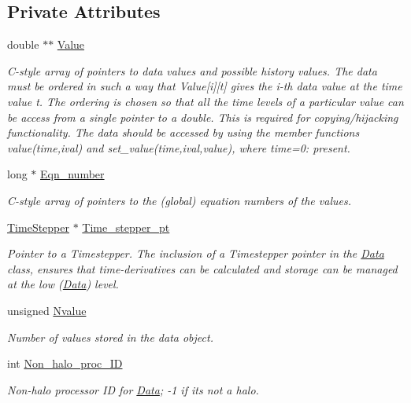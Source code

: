 \subsection*{Private Attributes}
\begin{DoxyCompactItemize}
\item 
double $\ast$$\ast$ \hyperlink{classoomph_1_1Data_aa69aab29cca43c9be329904807203ef1}{Value}
\begin{DoxyCompactList}\small\item\em C-\/style array of pointers to data values and possible history values. The data must be ordered in such a way that Value\mbox{[}i\mbox{]}\mbox{[}t\mbox{]} gives the i-\/th data value at the time value t. The ordering is chosen so that all the time levels of a particular value can be access from a single pointer to a double. This is required for copying/hijacking functionality. The data should be accessed by using the member functions value(time,ival) and set\+\_\+value(time,ival,value), where time=0\+: present. \end{DoxyCompactList}\item 
long $\ast$ \hyperlink{classoomph_1_1Data_a1863d191b66fc4b22fa282ef357c0513}{Eqn\+\_\+number}
\begin{DoxyCompactList}\small\item\em C-\/style array of pointers to the (global) equation numbers of the values. \end{DoxyCompactList}\item 
\hyperlink{classoomph_1_1TimeStepper}{Time\+Stepper} $\ast$ \hyperlink{classoomph_1_1Data_a63442f4cabaff13e7116e0b80d350d92}{Time\+\_\+stepper\+\_\+pt}
\begin{DoxyCompactList}\small\item\em Pointer to a Timestepper. The inclusion of a Timestepper pointer in the \hyperlink{classoomph_1_1Data}{Data} class, ensures that time-\/derivatives can be calculated and storage can be managed at the low (\hyperlink{classoomph_1_1Data}{Data}) level. \end{DoxyCompactList}\item 
unsigned \hyperlink{classoomph_1_1Data_a379d45fb0d0170fcdec06dbbc97a504d}{Nvalue}
\begin{DoxyCompactList}\small\item\em Number of values stored in the data object. \end{DoxyCompactList}\item 
int \hyperlink{classoomph_1_1Data_a5474e601ebda6bde66c179c92831729e}{Non\+\_\+halo\+\_\+proc\+\_\+\+ID}
\begin{DoxyCompactList}\small\item\em Non-\/halo processor ID for \hyperlink{classoomph_1_1Data}{Data}; -\/1 if it\textquotesingle{}s not a halo. \end{DoxyCompactList}\end{DoxyCompactItemize}
